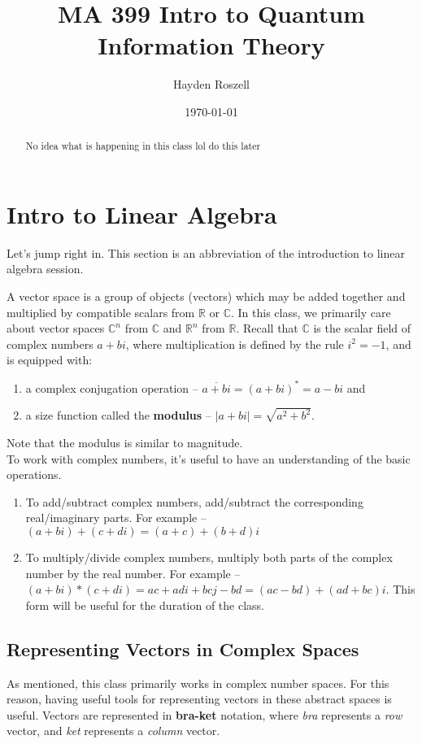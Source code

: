 \documentclass[12pt]{article}
\title{MA 399 Intro to Quantum Information Theory}
\author{Hayden Roszell}
\date{\today}
\theoremstyle{plain}
\theoremstyle{nonumberplain}
\theoremstyle{plain}
\theoremstyle{nonumberplain}
\newcommand\ol{\overline}
\newcommand\1{{\bf 1}}
\newcommand{\R}{\mathbb{R}} %
\newcommand{\C}{\mathbb{C}} %
\newcommand{\<}{\left\langle}
\renewcommand{\>}{\right\rangle}
\newcommand{\abs}[1]{\left\lvert #1 \right\rvert} %
\begin{document}
\maketitle
\begin{abstract}
No idea what is happening in this class lol do this later
\end{abstract}

\tableofcontents



\section{Intro to Linear Algebra}

Let's jump right in. This section is an abbreviation of the introduction to linear algebra session.

A vector space is a group of objects (vectors) which may be added together and multiplied by compatible scalars from $\R$ or $\C$. In this class, we primarily care about vector spaces $\C^n$ from $\C$ and $\R^n$ from $\R$. Recall that $\C$ is the scalar field of complex numbers $a+bi$, where multiplication is defined by the rule $i^2=-1$, and is equipped with:
\begin{enumerate}[label=(\alph*)]
    \item a complex conjugation operation -- $\ol{a+bi}=(a+bi)^*=a-bi$ and
    \item a size function called the \textbf{modulus} -- $\abs{a+bi}=\sqrt{a^2+b^2}.$
\end{enumerate}
Note that the modulus is similar to magnitude. \\
To work with complex numbers, it's useful to have an understanding of the basic operations.
\begin{enumerate}[label=(\alph*)]
	\item To add/subtract complex numbers, add/subtract the corresponding real/imaginary parts. For 		example -- $(a+bi)+(c+di)=(a+c)+(b+d)i$
	\item To multiply/divide complex numbers, multiply both parts of the complex number by the real 		number. For example -- $(a+bi)*(c+di)=ac+adi+bcj-bd=(ac-bd)+(ad+bc)i$. This form will be useful 		for the duration of the class.
\end{enumerate}


\subsection{Representing Vectors in Complex Spaces}
As mentioned, this class primarily works in complex number spaces. For this reason, having useful tools for representing vectors in these abstract spaces is useful. Vectors are represented in \textbf{bra-ket} notation, where \textit{bra} represents a \textit{row} vector, and \textit{ket} represents a \textit{column} vector.
\end{document}
